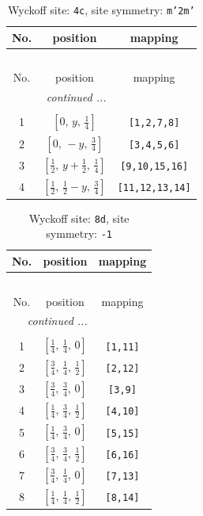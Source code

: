 \documentclass[fleqn,8pt]{jsarticle}
\begin{document}
\renewcommand{\arraystretch}{1.2}
\begin{longtable}{ccc}
\caption{Wyckoff site: {\tt 4c}, site symmetry: {\tt m'2m'}}
 \\
 \hline \hline
No. & position & mapping \\ \hline \endfirsthead

\multicolumn{2}{l}{\tablename\ \thetable{}} \\
 \hline \hline
No. & position & mapping \\ \hline \endhead

 \hline \hline
\multicolumn{2}{r}{\footnotesize\it continued ...} \\ \endfoot

 \hline \hline
\multicolumn{2}{r}{} \\ \endlastfoot

1 & $\left[ 0,\, y,\, \frac{1}{4} \right]$ & {\tt [1,2,7,8]} \\ \hline
2 & $\left[ 0,\, - y,\, \frac{3}{4} \right]$ & {\tt [3,4,5,6]} \\ \hline
3 & $\left[ \frac{1}{2},\, y + \frac{1}{2},\, \frac{1}{4} \right]$ & {\tt [9,10,15,16]} \\ \hline
4 & $\left[ \frac{1}{2},\, \frac{1}{2} - y,\, \frac{3}{4} \right]$ & {\tt [11,12,13,14]} \\
\end{longtable}
\renewcommand{\arraystretch}{1.2}
\begin{longtable}{ccc}
\caption{Wyckoff site: {\tt 8d}, site symmetry: {\tt -1}}
 \\
 \hline \hline
No. & position & mapping \\ \hline \endfirsthead

\multicolumn{2}{l}{\tablename\ \thetable{}} \\
 \hline \hline
No. & position & mapping \\ \hline \endhead

 \hline \hline
\multicolumn{2}{r}{\footnotesize\it continued ...} \\ \endfoot

 \hline \hline
\multicolumn{2}{r}{} \\ \endlastfoot

1 & $\left[ \frac{1}{4},\, \frac{1}{4},\, 0 \right]$ & {\tt [1,11]} \\ \hline
2 & $\left[ \frac{3}{4},\, \frac{1}{4},\, \frac{1}{2} \right]$ & {\tt [2,12]} \\ \hline
3 & $\left[ \frac{3}{4},\, \frac{3}{4},\, 0 \right]$ & {\tt [3,9]} \\ \hline
4 & $\left[ \frac{1}{4},\, \frac{3}{4},\, \frac{1}{2} \right]$ & {\tt [4,10]} \\ \hline
5 & $\left[ \frac{1}{4},\, \frac{3}{4},\, 0 \right]$ & {\tt [5,15]} \\ \hline
6 & $\left[ \frac{3}{4},\, \frac{3}{4},\, \frac{1}{2} \right]$ & {\tt [6,16]} \\ \hline
7 & $\left[ \frac{3}{4},\, \frac{1}{4},\, 0 \right]$ & {\tt [7,13]} \\ \hline
8 & $\left[ \frac{1}{4},\, \frac{1}{4},\, \frac{1}{2} \right]$ & {\tt [8,14]} \\
\end{longtable}
\end{document}
